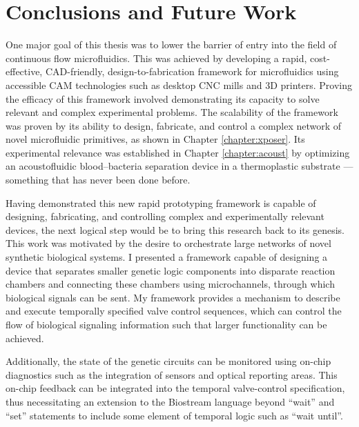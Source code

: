 \chapter{Conclusions and Future Work}
\label{chapter:Conclusions}
\thispagestyle{myheadings}

\graphicspath{{3_Conclusion/Figures/}}

One major goal of this thesis was to lower the barrier of entry into the field of continuous flow microfluidics. This was achieved by developing a rapid, cost-effective, CAD-friendly, design-to-fabrication framework for microfluidics using accessible CAM technologies such as desktop CNC mills and 3D printers. Proving the efficacy of this framework involved demonstrating its capacity to solve relevant and complex experimental problems. The scalability of the framework was proven by its ability to design, fabricate, and control a complex network of novel microfluidic primitives, as shown in Chapter \ref{chapter:xposer}. Its experimental relevance was established in Chapter \ref{chapter:acoust} by optimizing an acoustofluidic blood--bacteria separation device in a thermoplastic substrate --- something that has never been done before.

Having demonstrated this new rapid prototyping framework is capable of designing, fabricating, and controlling complex and experimentally relevant devices, the next logical step would be to bring this research back to its genesis. This work was motivated by the desire to orchestrate large networks of novel synthetic biological systems. I presented a framework capable of designing a device that separates smaller genetic logic components into disparate reaction chambers and connecting these chambers using microchannels, through which biological signals can be sent. My framework provides a mechanism to describe and execute temporally specified valve control sequences, which can control the flow of biological signaling information such that larger functionality can be achieved. 

Additionally, the state of the genetic circuits can be monitored using on-chip diagnostics such as the integration of sensors and optical reporting areas. This on-chip feedback can be integrated into the temporal valve-control specification, thus necessitating an extension to the Biostream language beyond ``wait'' and ``set'' statements to include some element of temporal logic such as ``wait until''.

